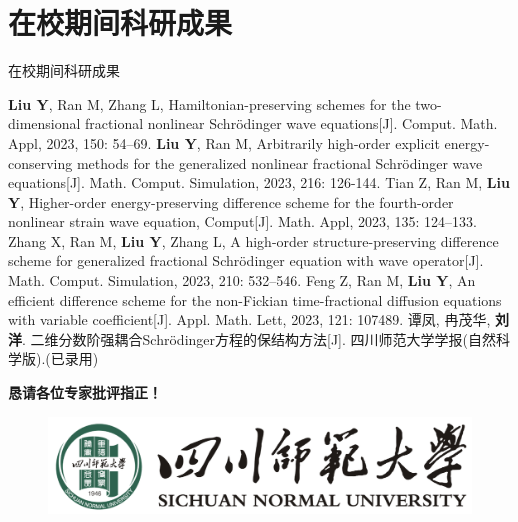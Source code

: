 \documentclass[aspectratio=169]{beamer}
\numberwithin{theorem}{section} %
\numberwithin{equation}{section}%
\numberwithin{figure}{section}%
\numberwithin{table}{section}%
\begin{document}
\section*{在校期间科研成果}
\begin{frame}{在校期间科研成果}\footnotesize
	\begin{thebibliography}{99}  
	 {\textbf{\color{purple}Liu Y}}, Ran M, Zhang L, Hamiltonian-preserving schemes for the two-dimensional fractional nonlinear Schrödinger wave equations[J]. Comput. Math. Appl, 2023, 150: 54–69.
	 {\textbf{\color{purple}Liu Y}}, Ran M, Arbitrarily high-order explicit energy-conserving methods for the generalized nonlinear fractional Schrödinger wave equations[J]. Math. Comput. Simulation, 2023, 216: 126-144.
	 Tian Z, Ran M, {\textbf{\color{purple}Liu Y}}, Higher-order energy-preserving difference scheme for the fourth-order nonlinear strain wave equation, Comput[J]. Math. Appl, 2023, 135: 124–133.
	 Zhang X, Ran M, {\textbf{\color{purple}Liu Y}}, Zhang L, A high-order structure-preserving difference scheme for generalized fractional Schrödinger equation with wave operator[J]. Math. Comput. Simulation, 2023, 210: 532–546.
	 Feng Z, Ran M, {\textbf{\color{purple}Liu Y}}, An efficient difference scheme for the non-Fickian time-fractional diffusion equations with variable coefficient[J]. Appl. Math. Lett, 2023, 121: 107489.
	 谭凤, 冉茂华, {\textbf{\color{purple}刘洋}}. 二维分数阶强耦合Schr{\"o}dinger方程的保结构方法[J]. 四川师范大学学报(自然科学版).(已录用)
	\end{thebibliography}
\end{frame}
 

\begin{frame}
\begin{center}
{\Huge\calligra \textbf{\textcolor[rgb]{0.227,0.373,0.306}{恳请各位专家批评指正！}}}
\end{center}
\begin{figure}[htpb]
	\begin{center}
		\includegraphics[width=0.45\linewidth]{pic/SICNU_Logo2.png}
	\end{center}
\end{figure}
\end{frame}
\end{document}
